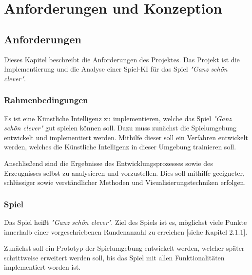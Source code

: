 \section{Anforderungen und Konzeption}
\subsection{Anforderungen}
Dieses Kapitel beschreibt die Anforderungen des Projektes. Das Projekt ist die Implementierung und die Analyse einer Spiel-KI für das Spiel \textit{"Ganz schön clever"}.
\subsubsection{Rahmenbedingungen}
Es ist eine Künstliche Intelligenz zu implementieren, welche das Spiel \textit{"Ganz schön clever"} gut spielen können soll. Dazu muss zunächst die Spielumgebung entwickelt und implementiert werden. Mithilfe dieser soll ein Verfahren entwickelt werden, welches die Künstliche Intelligenz in dieser Umgebung trainieren soll.

Anschließend sind die Ergebnisse des Entwicklungsprozesses sowie des Erzeugnisses selbst zu analysieren und vorzustellen. Dies soll mithilfe geeigneter, schlüssiger sowie verständlicher Methoden und Visualisierungstechniken erfolgen.
\subsubsection{Spiel}
Das Spiel heißt \textit{"Ganz schön clever"}. Ziel des Spiels ist es, möglichst viele Punkte innerhalb einer vorgeschriebenen Rundenanzahl zu erreichen [siehe Kapitel 2.1.1].

Zunächst soll ein Prototyp der Spielumgebung entwickelt werden, welcher später schrittweise erweitert werden soll, bis das Spiel mit allen Funktionalitäten implementiert worden ist.\\

